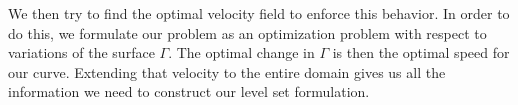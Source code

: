 We then try to find the optimal velocity field to enforce this behavior. In order
to do this, we formulate our problem as an optimization problem with respect to variations
of the surface $\Gamma$. The optimal change in $\Gamma$ is then the optimal speed for 
our curve. Extending that velocity to the entire domain gives us all the information we 
need to construct our level set formulation.




